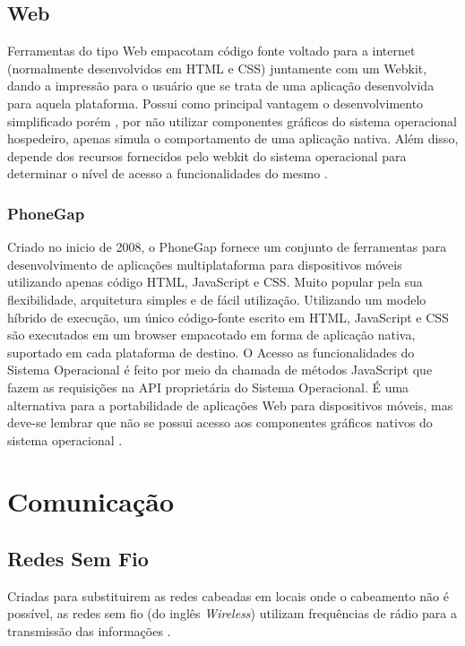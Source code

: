 \section{Web}
Ferramentas do tipo Web empacotam código fonte voltado para a internet (normalmente desenvolvidos em HTML e CSS) juntamente com um Webkit, dando a impressão para o usuário que se trata de uma aplicação desenvolvida para aquela plataforma. Possui como principal vantagem o desenvolvimento simplificado porém , por não utilizar componentes gráficos do sistema operacional hospedeiro, apenas simula o comportamento de uma aplicação nativa. Além disso, depende dos recursos fornecidos pelo webkit do sistema operacional para determinar o nível de acesso a funcionalidades do mesmo 
\cite{CrossPlatformMobileDevelopment2011}.

\subsection{PhoneGap}
Criado no inicio de 2008, o PhoneGap fornece um conjunto de ferramentas para desenvolvimento de aplicações multiplataforma para dispositivos móveis utilizando apenas código HTML, JavaScript e CSS. Muito popular pela sua flexibilidade, arquitetura simples e de fácil utilização. Utilizando um modelo híbrido de execução, um único código-fonte escrito em HTML, JavaScript e CSS são executados em um browser empacotado em forma de aplicação nativa, suportado em cada plataforma de destino. O Acesso as funcionalidades do Sistema Operacional é feito por meio da chamada de métodos JavaScript que fazem as requisições na API proprietária do Sistema Operacional. É uma alternativa para a portabilidade de aplicações Web para dispositivos móveis, mas deve-se lembrar que não se possui acesso aos componentes gráficos nativos do sistema operacional
\cite{CrossPlatformMobileDevelopment2011}.

\chapter{Comunicação}

\section{Redes Sem Fio}
Criadas para substituirem as redes cabeadas em locais onde o cabeamento não é possível, as redes sem fio (do inglês \emph{Wireless}) utilizam frequências de rádio para a transmissão das informações \cite{RedesSemFioUFLA}.

